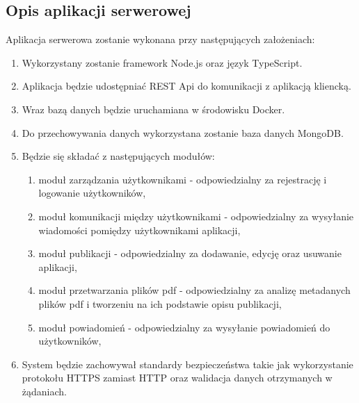 \documentclass[8pt]{article}
\begin{document}
	\subsection{Opis aplikacji serwerowej}
		\hspace{10pt} Aplikacja serwerowa zostanie wykonana przy następujących założeniach:
	\begin{enumerate}
		\item Wykorzystany zostanie framework Node.js oraz język TypeScript.
		\item Aplikacja będzie udostępniać REST Api do komunikacji z aplikacją kliencką.
		\item Wraz bazą danych będzie uruchamiana w środowisku Docker.
		\item Do przechowywania danych wykorzystana zostanie baza danych MongoDB.
		\item Będzie się składać z następujących modułów:
		\begin{enumerate}
			\item moduł zarządzania użytkownikami - odpowiedzialny za rejestrację i logowanie użytkowników,
			\item moduł komunikacji między użytkownikami - odpowiedzialny za wysyłanie wiadomości pomiędzy użytkownikami aplikacji,
			\item moduł publikacji - odpowiedzialny za dodawanie, edycję oraz usuwanie aplikacji,
			\item moduł przetwarzania plików pdf - odpowiedzialny za analizę metadanych plików pdf i tworzeniu na ich podstawie opisu publikacji,
			\item moduł powiadomień - odpowiedzialny za wysyłanie powiadomień do użytkowników,					
		\end{enumerate}		
		\item System będzie zachowywał standardy bezpieczeństwa takie jak wykorzystanie protokołu HTTPS zamiast HTTP oraz walidacja danych otrzymanych w żądaniach.
	\end{enumerate}
\end{document}
